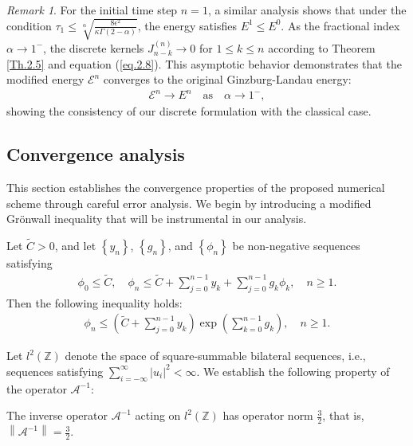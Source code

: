 \documentclass{siamart171218}
\theoremstyle{remark}
\newtheorem{remark}{Remark}  %
\theoremstyle{example}
\numberwithin{equation}{section}
\begin{document}
\begin{remark}\label{Re.2}
For the initial time step $n=1$, a similar analysis shows that under the condition $\tau_1 \leq \sqrt[\alpha]{\frac{8\epsilon^2}{\kappa\Gamma(2-\alpha)}}$, the energy satisfies $E^1 \leq E^0$.
As the fractional index $\alpha \to 1^-$, the discrete kernels $J_{n-k}^{(n)} \to 0$ for $1 \leq k \leq n$ according to Theorem \ref{Th.2.5} and equation (\ref{eq.2.8}). This asymptotic behavior demonstrates that the modified energy $\mathcal{E}^n$ converges to the original Ginzburg-Landau energy:
\begin{align*}
\mathcal{E}^n \to E^n \quad \text{as} \quad \alpha \to 1^-,
\end{align*}
showing the consistency of our discrete formulation with the classical case.
\end{remark}

\subsection{Convergence analysis}\label{sec: Convergence analysis}

This section establishes the convergence properties of the proposed numerical scheme through careful error analysis. We begin by introducing a modified Gr\"{o}nwall inequality that will be instrumental in our analysis.

\begin{lemma}\label{Le.4.6}
Let $\widetilde{C}>0$, and let $\left\{y_n\right\}$, $\left\{g_n\right\}$,
 and $\left\{\phi_n\right\}$ be non-negative sequences satisfying
\begin{align*}
\phi_{0}\leq \widetilde{C},\quad \phi_{n}\leq \widetilde{C}+\sum\limits_{j=0}^{n-1}y_{k}+\sum\limits_{j=0}^{n-1}g_{k}\phi_{k}, \quad n\geq 1.
\end{align*}
Then the following inequality holds:
\begin{align*}
\phi_n \leq \left(\widetilde{C}+\sum\limits_{j=0}^{n-1}y_{k} \right) \exp\left(\sum_{k=0}^{n-1}g_k\right), \quad n\geq 1.
\end{align*}
\end{lemma}

Let $l^2(\mathbb{Z})$ denote the space of square-summable bilateral sequences, i.e., sequences satisfying $\sum_{i=-\infty}^{\infty}|u_i|^2<\infty$. We establish the following property of the operator $\mathcal{A}^{-1}$:

\begin{lemma}\label{Le.4.7}
The inverse operator $\mathcal{A}^{-1}$ acting on $l^2(\mathbb{Z})$ has operator norm $\frac{3}{2}$, that is, $\left\|\mathcal{A}^{-1}\right\|=\frac{3}{2}$.
\end{lemma}
\end{document}
